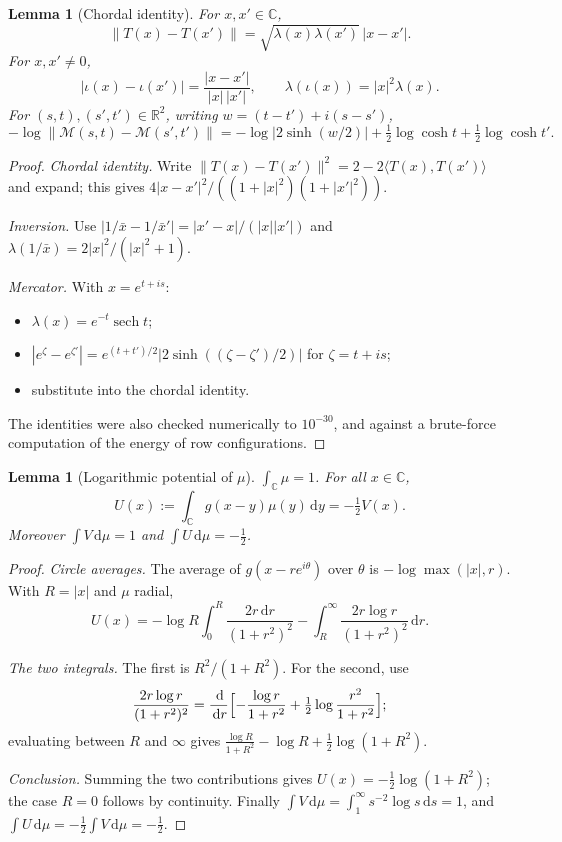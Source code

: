 \documentclass[11pt]{article}
\newtheorem{lemma}[theorem]{Lemma}
\theoremstyle{definition}
\theoremstyle{remark}
\newcommand{\R}{\mathbb R}
\newcommand{\C}{\mathbb C}
\newcommand{\dd}{\,\mathrm d}
\begin{document}
\begin{lemma}[Chordal identity]\label{lem:chordal}
For $x,x'\in\C$,
\[
\|T(x)-T(x')\|=\sqrt{\lambda(x)\lambda(x')}\,|x-x'| .
\]
For $x,x'\neq0$,
\[
|\iota(x)-\iota(x')|=\frac{|x-x'|}{|x|\,|x'|},
\qquad
\lambda(\iota(x))=|x|^2\lambda(x).
\]
For $(s,t),(s',t')\in\R^2$, writing $w=(t-t')+i(s-s')$,
\[
-\log\|\mathcal M(s,t)-\mathcal M(s',t')\|
=-\log|2\sinh(w/2)|+\tfrac12\log\cosh t+\tfrac12\log\cosh t' .
\]
\end{lemma}
\begin{proof}
\emph{Chordal identity.} Write $\|T(x)-T(x')\|^2=2-2\langle T(x),T(x')\rangle$ and expand; this
gives $4|x-x'|^2/((1+|x|^2)(1+|x'|^2))$.

\emph{Inversion.} Use $|1/\bar x-1/\bar x'|=|x'-x|/(|x||x'|)$ and
$\lambda(1/\bar x)=2|x|^2/(|x|^2+1)$.

\emph{Mercator.} With $x=e^{t+is}$:
\begin{itemize}[leftmargin=*]
\item $\lambda(x)=e^{-t}\operatorname{sech}t$;
\item $|e^{\zeta}-e^{\zeta'}|=e^{(t+t')/2}|2\sinh((\zeta-\zeta')/2)|$ for $\zeta=t+is$;
\item substitute into the chordal identity.
\end{itemize}
The identities were also checked numerically to $10^{-30}$, and against a brute-force
computation of the energy of row configurations.
\end{proof}

\begin{lemma}[Logarithmic potential of $\mu$]\label{lem:U}
$\int_\C\mu=1$. For all $x\in\C$,
\[
U(x):=\int_\C g(x-y)\mu(y)\dd y=-\tfrac12V(x).
\]
Moreover $\int V\dd\mu=1$ and $\int U\dd\mu=-\tfrac12$.
\end{lemma}
\begin{proof}
\emph{Circle averages.} The average of $g(x-re^{i\theta})$ over $\theta$ is
$-\log\max(|x|,r)$. With $R=|x|$ and $\mu$ radial,
\[
U(x)=-\log R\int_0^R\frac{2r\dd r}{(1+r^2)^2}-\int_R^\infty\frac{2r\log r}{(1+r^2)^2}\dd r .
\]

\emph{The two integrals.} The first is $R^2/(1+R^2)$. For the second, use
\[
\frac{2r\log r}{(1+r^2)^2}=\frac{\dd}{\dd r}\Bigl[-\frac{\log r}{1+r^2}
+\tfrac12\log\frac{r^2}{1+r^2}\Bigr];
\]
evaluating between $R$ and $\infty$ gives
$\frac{\log R}{1+R^2}-\log R+\frac12\log(1+R^2)$.

\emph{Conclusion.} Summing the two contributions gives $U(x)=-\tfrac12\log(1+R^2)$; the case
$R=0$ follows by continuity. Finally $\int V\dd\mu=\int_1^\infty s^{-2}\log s\dd s=1$, and
$\int U\dd\mu=-\tfrac12\int V\dd\mu=-\tfrac12$.
\end{proof}
\end{document}
